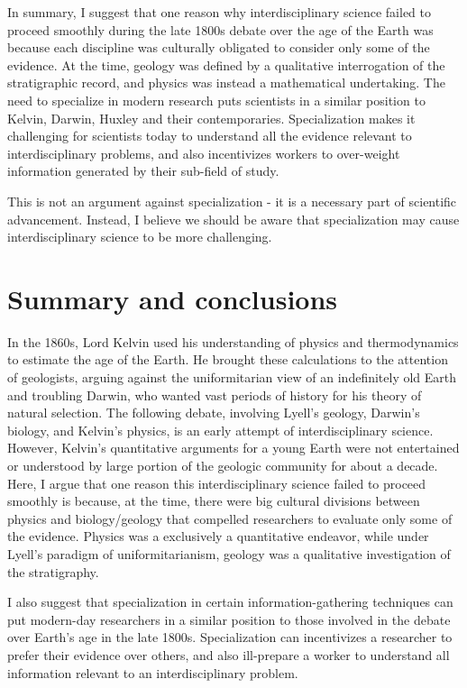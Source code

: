\documentclass[12pt]{article}
\begin{document}
In summary, I suggest that one reason why interdisciplinary science failed to proceed smoothly during the late 1800s debate over the age of the Earth was because each discipline was culturally obligated to consider only some of the evidence. At the time, geology was defined by a qualitative interrogation of the stratigraphic record, and physics was instead a mathematical undertaking. The need to specialize in modern research puts scientists in a similar position to Kelvin, Darwin, Huxley and their contemporaries. Specialization makes it challenging for scientists today to understand all the evidence relevant to interdisciplinary problems, and also incentivizes workers to over-weight information generated by their sub-field of study.

This is not an argument against specialization - it is a necessary part of scientific advancement. Instead, I believe we should be aware that specialization may cause interdisciplinary science to be more challenging.

\section{Summary and conclusions} \label{sec:4}

In the 1860s, Lord Kelvin used his understanding of physics and thermodynamics to estimate the age of the Earth. He brought these calculations to the attention of geologists, arguing against the uniformitarian view of an indefinitely old Earth and troubling Darwin, who wanted vast periods of history for his theory of natural selection. The following debate, involving Lyell's geology, Darwin's biology, and Kelvin's physics, is an early attempt of interdisciplinary science. However, Kelvin's quantitative arguments for a young Earth were not entertained or understood by large portion of the geologic community for about a decade. Here, I argue that one reason this interdisciplinary science failed to proceed smoothly is because, at the time, there were big cultural divisions between physics and biology/geology that compelled researchers to evaluate only some of the evidence. Physics was a exclusively a quantitative endeavor, while under Lyell's paradigm of uniformitarianism, geology was a qualitative investigation of the stratigraphy. 

I also suggest that specialization in certain information-gathering techniques can put modern-day researchers in a similar position to those involved in the debate over Earth's age in the late 1800s. Specialization can incentivizes a researcher to prefer their evidence over others, and also ill-prepare a worker to understand all information relevant to an interdisciplinary problem.



\end{document}
